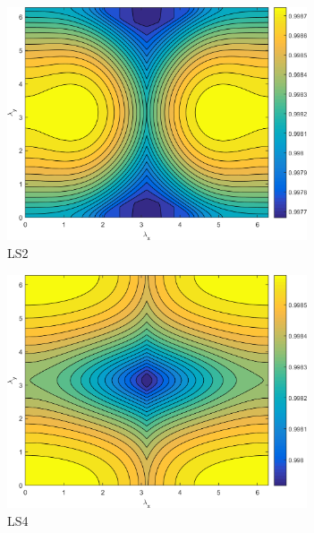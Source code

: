 \begin{figure}
\centering
	{
	\begin{subfigure}[b]{0.485\textwidth}
		\centering
		\includegraphics[width=0.975\textwidth]{figures/sec_DSA/PHI_SI_MIP_C=4_UPWLD1_LS2_sigt=640_c=9999_contour.png}
		\caption{LS2}
	\end{subfigure}
	\hfill
	\begin{subfigure}[b]{0.485\textwidth}
		\centering
		\includegraphics[width=0.975\textwidth]{figures/sec_DSA/PHI_SI_MIP_C=4_UPWLD1_LS4_sigt=640_c=9999_contour.png}
		\caption{LS4}
	\end{subfigure}
	}
	\vspace{1.5cm}
	{
	\begin{subfigure}[b]{0.485\textwidth}

\end{subfigure}}
\end{figure}
